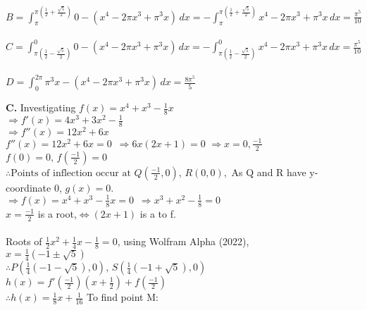 \documentclass{homework}
\begin{document}
\begin{flushleft}
    $B=\int_\pi^{\pi(\frac{1}{2}+\frac{\sqrt{5}}{2})} 0-(x^4-2\pi x^3+\pi^3x) \, dx=-\int_\pi^{\pi(\frac{1}{2}+\frac{\sqrt{5}}{2})} x^4-2\pi x^3+\pi^3x \, dx=\frac{\pi^5}{10}$ \, \,  \\
    $C=\int_{\pi(\frac{1}{2}-\frac{\sqrt{5}}{2})}^{0} 0-(x^4-2\pi x^3+\pi^3x)  \, dx 
    =-\int_{\pi(\frac{1}{2}-\frac{\sqrt{5}}{2})}^{0} x^4-2\pi x^3+\pi^3x  \, dx=\frac{\pi^5}{10}$ \, \,  \\
    $D=\int_{0}^{2\pi} \pi^{3}x-(x^4-2\pi x^3+\pi^3x)  \, dx =\frac{8\pi^5}{5} $
    \linebreak \linebreak 
\end{flushleft}
\begin{flushleft}
     \textbf{C. }Investigating $f(x)=x^4+x^3-\frac{1}{8}x$ \\
     $\Rightarrow f'(x)=4x^3+3x^2-\frac{1}{8}$ \\
     $\Rightarrow f''(x)=12x^2+6x$ \\
     $  f''(x)=12x^2+6x=0 \, \, \, \Rightarrow 6x(2x+1)=0 \, \, \Rightarrow x=0, \frac{-1}{2}$ \\
     $f(0)=0, \, f(\frac{-1}{2})=0$ \\
     $\therefore \text{Points of inflection occur at }Q(\frac{-1}{2}, 0), \, R(0,0),$  \linebreak \linebreak
    As Q and R have y-coordinate 0, $g(x)=0$. \\
    $ \Rightarrow f(x)=x^4+x^3-\frac{1}{8}x=0  \, \, \, \Rightarrow x^3+x^2-\frac{1}{8}=0 $ \\
    $x=\frac{-1}{2}$ is a root,$\iff (2x+1)$ is a to f. \\
     \\
    Roots of $\frac{1}{2}x^2+\frac{1}{4}x-\frac{1}{8}=0$, using Wolfram Alpha (2022), \\
    $x=\frac{1}{4} (-1 \pm \sqrt{5})$ \\
    $\therefore P\left(\frac{1}{4}\left(-1-\sqrt{5}\right),0\right), \, S\left(\frac{1}{4}\left(-1+\sqrt{5}\right),0\right)$ \linebreak \linebreak
    $h(x)=f'(\frac{-1}{2})(x+\frac{1}{2})+f(\frac{-1}{2})$ \\
    $\therefore h(x)=\frac{1}{8}x+\frac{1}{16}$ \linebreak \linebreak
    To find point M: \\

\end{flushleft}
\end{document}

